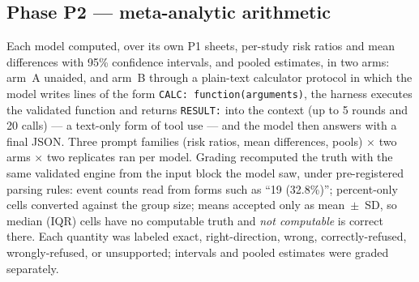 \documentclass[11pt]{article}
\begin{document}
\subsection{Phase P2 --- meta-analytic arithmetic}
Each model computed, over its own P1 sheets, per-study risk ratios and mean differences with 95\% confidence intervals, and pooled estimates, in two arms: arm~A unaided, and arm~B through a plain-text calculator protocol in which the model writes lines of the form \texttt{CALC: function(arguments)}, the harness executes the validated function and returns \texttt{RESULT:} into the context (up to 5 rounds and 20 calls) --- a text-only form of tool use \citep{schick2023toolformer,gao2023pal} --- and the model then answers with a final JSON. Three prompt families (risk ratios, mean differences, pools) $\times$ two arms $\times$ two replicates ran per model. Grading recomputed the truth with the same validated engine from the input block the model saw, under pre-registered parsing rules: event counts read from forms such as ``19 (32.8\%)''; percent-only cells converted against the group size; means accepted only as mean~$\pm$~SD, so median (IQR) cells have no computable truth and \emph{not computable} is correct there. Each quantity was labeled exact, right-direction, wrong, correctly-refused, wrongly-refused, or unsupported; intervals and pooled estimates were graded separately.
\end{document}
